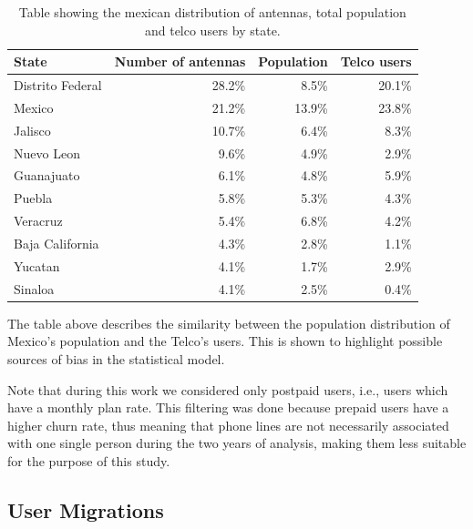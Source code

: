 \begin{table}[ht]
	\caption{Table showing the mexican distribution of antennas, total population and telco users by state.}\label{tab:distribution_by_state}
	\centering
	\begin{tabular}{l r r r}
		\toprule
		State				& Number of antennas & Population 	& Telco users \\
		\midrule
		Distrito Federal      & 28.2\% 	& 8.5\%		& 20.1\%   \\
		Mexico                     & 21.2\%		&   13.9\% 	& 23.8\%   \\
		Jalisco                   & 10.7\% 	& 6.4\%		& 8.3\%    \\
		Nuevo Leon               & 9.6\%	& 4.9\%		& 2.9\% \\
		Guanajuato               & 6.1\%	& 4.8\%		& 5.9\% \\
		Puebla                     & 5.8\%	& 5.3\%		& 4.3\% \\
		Veracruz                  & 5.4\% 	& 6.8\%		& 4.2\% \\
		Baja California       & 4.3\%	& 2.8\%		& 1.1\% \\
		Yucatan                   & 4.1\%	& 1.7\%		& 2.9\% \\
		Sinaloa                   & 4.1\%	& 2.5\%		& 0.4\% \\
		\bottomrule
	\end{tabular}
\end{table}

The table above describes the similarity between the population distribution of Mexico's population and the Telco's users.
This is shown to highlight possible sources of bias in the statistical model.

Note that during this work we considered only postpaid users, i.e., users which have a monthly plan rate.
This filtering was done because prepaid users have a higher churn rate, thus meaning that phone lines are not necessarily associated with one single person during the two years of analysis, making them less suitable for the purpose of this study.




\subsection{User Migrations}\label{subsection:user_migrations} %

